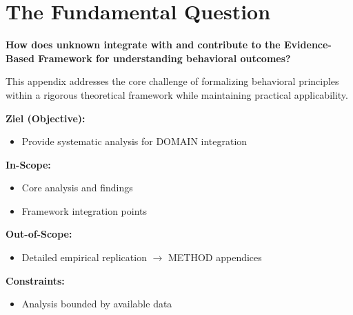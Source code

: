 
\section{The Fundamental Question}
\label{sec:x-fundamental}

\begin{tcolorbox}[
    colback=red!5!white,
    colframe=red!75!black,
    title={\textbf{Fundamental Question}}
]
\textbf{How does unknown integrate with and contribute to the
Evidence-Based Framework for understanding behavioral outcomes?}

This appendix addresses the core challenge of formalizing behavioral principles
within a rigorous theoretical framework while maintaining practical applicability.
\end{tcolorbox}



\begin{tcolorbox}[
    colback=orange!5!white,
    colframe=orange!75!black,
    title={\textbf{Appendix Scope: Ziel / In-Scope / Out-of-Scope / Constraints}},
    fonttitle=\bfseries
]

\textbf{Ziel (Objective):}
\begin{itemize}[nosep]
    \item Provide systematic analysis for DOMAIN integration
\end{itemize}

\textbf{In-Scope:}
\begin{itemize}[nosep]
    \item Core analysis and findings
    \item Framework integration points
\end{itemize}

\textbf{Out-of-Scope:}
\begin{itemize}[nosep]
    \item Detailed empirical replication $\rightarrow$ METHOD appendices
\end{itemize}

\textbf{Constraints:}
\begin{itemize}[nosep]
    \item Analysis bounded by available data
\end{itemize}

\end{tcolorbox}

